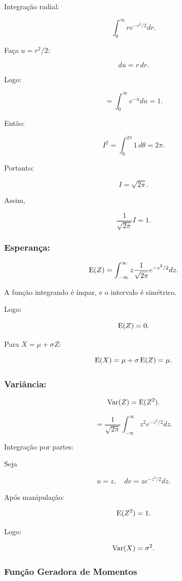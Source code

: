 Integração radial:

\[
\int_{0}^{\infty}
r e^{-r^2/2}
dr.
\]

Faça $u=r^2/2$:

\[
du = r\,dr.
\]

Logo:

\[
=
\int_0^\infty e^{-u} du
=
1.
\]

Então:

\[
I^2
=
\int_0^{2\pi} 1\, d\theta
=
2\pi.
\]

Portanto:

\[
I=\sqrt{2\pi}.
\]

Assim,

\[
\frac{1}{\sqrt{2\pi}}
I
=
1.
\]



\subsubsection{Esperança:}

\[
\operatorname{E}(Z)
=
\int_{-\infty}^{\infty}
z
\frac{1}{\sqrt{2\pi}}
e^{-z^2/2}
dz.
\]

A função integrando é ímpar,
e o intervalo é simétrico.

Logo:

\[
\operatorname{E}(Z)=0.
\]

Para $X=\mu+\sigma Z$:

\[
\operatorname{E}(X)
=
\mu+\sigma\operatorname{E}(Z)
=
\mu.
\]

\subsubsection{Variância:}

\[
\operatorname{Var}(Z)
=
\operatorname{E}(Z^2).
\]

\[
=
\frac{1}{\sqrt{2\pi}}
\int_{-\infty}^{\infty}
z^2 e^{-z^2/2} dz.
\]

Integração por partes:

Seja

\[
u=z,
\quad
dv=z e^{-z^2/2}dz.
\]

Após manipulação:

\[
\operatorname{E}(Z^2)=1.
\]

Logo:

\[
\operatorname{Var}(X)
=
\sigma^2.
\]

\subsubsection{Função Geradora de Momentos}

